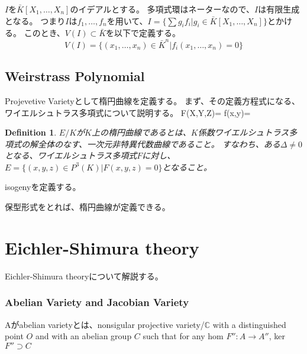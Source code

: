\documentclass{ujarticle}
\newtheorem{dfn}[thm]{Definition}
\begin{document}
$I$を$\bar{K}[X_1,\dots,X_n]$のイデアルとする。
多項式環はネーターなので、$I$は有限生成となる。
つまり$I$は$f_1,\dots,f_n$を用いて、$I = \{ \sum g_if_i | g_i \in \bar{K}[X_1,\dots,X_n] \}$とかける。
このとき、$V(I) \subset \bar{K}$を以下で定義する。
\begin{equation*}
  V(I) = \{ (x_1 , \dots , x_n) \in \bar{K}^n | f_i(x_1,\dots,x_n)=0 \}
\end{equation*}

\subsection{Weirstrass Polynomial}
\label{sub:Weirstrass Polynomial}

Projevetive Varietyとして楕円曲線を定義する。
まず、その定義方程式になる、ワイエルシュトラス多項式について説明する。
F(X,Y,Z)=
f(x,y)=

\begin{dfn}
 $E/K$が$K$上の楕円曲線であるとは、$K$係数ワイエルシュトラス多項式の解全体のなす、一次元非特異代数曲線であること。
 すなわち、ある$\Delta \neq 0$となる、ワイエルシュトラス多項式$F$に対し、
 $E = \{(x,y,z) \in P^3(K) |F(x,y,z)=0 \} $となること。
\end{dfn}

isogenyを定義する。


保型形式をとれば、楕円曲線が定義できる。



\section{Eichler-Shimura theory}
\label{sec:Eichler-Shimura theory}
Eichler-Shimura theoryについて解説する。

\subsubsection{Abelian Variety and Jacobian Variety}
\label{subs:Abelian Variety and Jacobian Variety}
Aがabelian varietyとは、nonsigular projective variety/$\mathbb{C}$ with a distinguished point $O$ and with an abelian group $C$ such that for any hom $F'':A \to A''$, ker$F'' \supset C$
\end{document}
